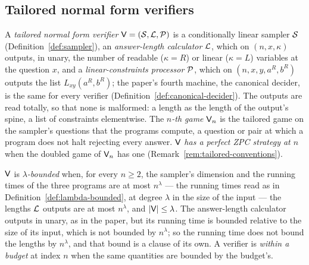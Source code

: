 \subsection{Tailored normal form verifiers}

\begin{definition}
\label{def:tailored-verifier}
\leanok
A \emph{tailored normal form verifier} $\verifier = (\cal{S}, \cal{L}, \cal{P})$
is a conditionally linear sampler $\cal{S}$ (Definition~\ref{def:sampler}), an
\emph{answer-length calculator} $\cal{L}$, which on $(n, x, \kappa)$ outputs, in unary, the
number of readable ($\kappa = R$) or linear ($\kappa = L$) variables at the question $x$, and a
\emph{linear-constraints processor} $\cal{P}$, which on $(n, x, y, a^R, b^R)$ outputs the
list $L_{xy}(a^R, b^R)$; the paper's fourth machine, the canonical decider, is the same for
every verifier (Definition~\ref{def:canonical-decider}). The outputs are read totally, so that
none is malformed: a length as the length of the output's spine, a list of constraints
elementwise. The \emph{$n$-th game} $\verifier_n$ is the tailored game
on the sampler's questions that the programs compute, a question or pair at which a program
does not halt rejecting every answer. $\verifier$ \emph{has a perfect ZPC strategy at $n$} when
the doubled game of $\verifier_n$ has one (Remark~\ref{rem:tailored-conventions}).
\end{definition}

\begin{definition}
\label{def:tailored-bounded}
\leanok
$\verifier$ is \emph{$\lambda$-bounded} when, for every $n \geq 2$, the sampler's dimension and
the running times of the three programs are at most $n^\lambda$ --- the running times read as
in Definition~\ref{def:lambda-bounded}, at degree $\lambda$ in the size of the input --- the
lengths $\cal{L}$ outputs are at most $n^\lambda$, and $\abs{\verifier} \leq \lambda$. The
answer-length calculator outputs in unary, as in the paper, but its running time is bounded
relative to the size of its input, which is not bounded by $n^\lambda$; so the running time does
not bound the lengths by $n^\lambda$, and that bound is a clause of its own. A verifier is
\emph{within a budget} at index $n$ when the same quantities are bounded by the budget's.
\end{definition}

